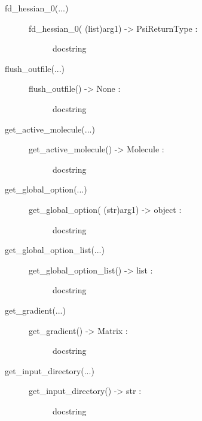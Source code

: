\documentclass[letterpaper,10pt,english]{sphinxmanual}
\begin{document}
\begin{description}
\begin{description}
\begin{description}
\end{description}

\item[{fd\_hessian\_0(...)}] \leavevmode\begin{description}
\item[{fd\_hessian\_0( (list)arg1) -\textgreater{} PsiReturnType :}] \leavevmode
docstring

\end{description}

\item[{flush\_outfile(...)}] \leavevmode\begin{description}
\item[{flush\_outfile() -\textgreater{} None :}] \leavevmode
docstring

\end{description}

\item[{get\_active\_molecule(...)}] \leavevmode\begin{description}
\item[{get\_active\_molecule() -\textgreater{} Molecule :}] \leavevmode
docstring

\end{description}

\item[{get\_global\_option(...)}] \leavevmode\begin{description}
\item[{get\_global\_option( (str)arg1) -\textgreater{} object :}] \leavevmode
docstring

\end{description}

\item[{get\_global\_option\_list(...)}] \leavevmode\begin{description}
\item[{get\_global\_option\_list() -\textgreater{} list :}] \leavevmode
docstring

\end{description}

\item[{get\_gradient(...)}] \leavevmode\begin{description}
\item[{get\_gradient() -\textgreater{} Matrix :}] \leavevmode
docstring

\end{description}

\item[{get\_input\_directory(...)}] \leavevmode\begin{description}
\item[{get\_input\_directory() -\textgreater{} str :}] \leavevmode
docstring


\end{description}
\end{description}
\end{description}
\end{document}
